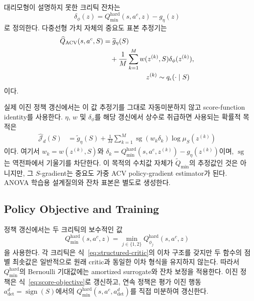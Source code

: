 \documentclass[10pt,journal]{IEEEtran}
\begin{document}
대리모형이 설명하지 못한 크리틱 잔차는
\begin{equation}
\delta_\phi(z)
=
Q_{\min}^{\mathrm{hard}}(s,a^c,z)-g_\eta(z)
\end{equation}
로 정의한다. 다중선형 가치 자체의 중요도 표본 추정기는
\begin{align}
\widehat Q_{\mathrm{ACV}}(s,a^c,S)
&=
\widetilde g_\eta(S)
\nonumber\\
&\quad+
\frac{1}{M}
\sum_{k=1}^{M}
    w(z^{(k)},S)\delta_\phi(z^{(k)}),
\label{eq:acv-estimator}\\
&\hspace{22mm}
    z^{(k)}\sim q_\epsilon(\cdot\mid S)
\nonumber
\end{align}
이다.

실제 이진 정책 갱신에서는 이 값 추정기를 그대로 자동미분하지 않고 score-function identity를 사용한다. $\eta$, $w$ 및 $\delta_\phi$를 해당 갱신에서 상수로 취급하면 사용되는 확률적 목적은
\begin{align}
\widehat{\mathcal J}_{d}(S)
&=
\widetilde g_\eta(S)
+\frac{1}{M}\sum_{k=1}^{M}
\operatorname{sg}\!\left(
w_k\delta_k
\right)
\log\mu_S(z^{(k)})
\label{eq:score-objective}
\end{align}
이다. 여기서 $w_k=w(z^{(k)},S)$와
$\delta_k=Q_{\min}^{\mathrm{hard}}(s,a^c,z^{(k)})-g_\eta(z^{(k)})$이며,
$\operatorname{sg}$는 역전파에서 기울기를 차단한다. 이 목적의 수치값 자체가
$\widetilde Q_{\min}$의 추정값인 것은 아니지만, 그 $S$-gradient는 중요도 가중 ACV
policy-gradient estimator가 된다. ANOVA 학습용 설계질의와 잔차 표본은 별도로 생성한다.


\subsection{Policy Objective and Training}

정책 갱신에서는 두 크리틱의 보수적인 값
\begin{equation}
Q_{\min}^{\mathrm{hard}}(s,a^c,z)
=
\min_{j\in\{1,2\}}
Q_{\phi_j}^{\mathrm{hard}}(s,a^c,z)
\end{equation}
을 사용한다. 각 크리틱은 식~\eqref{eq:structured-critic}의 이차 구조를 갖지만 두 함수의 점별 최솟값은 일반적으로 원래 critic과 동일한 이차 형식을 유지하지 않는다. 따라서 $Q_{\min}^{\mathrm{hard}}$의 Bernoulli 기대값에는 amortized surrogate와 잔차 보정을 적용한다. 이진 정책은 식~\eqref{eq:score-objective}로 갱신하고,
연속 정책은 평가 이진 행동
$a_{\mathrm{det}}^d=\operatorname{sign}(S)$에서의
$Q_{\min}^{\mathrm{hard}}(s,a^c,a_{\mathrm{det}}^d)$를 직접 미분하여 갱신한다.
\end{document}
